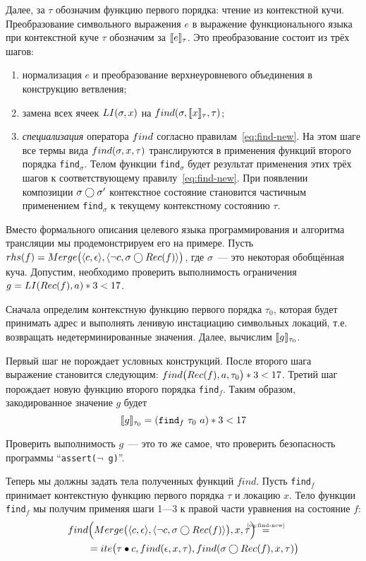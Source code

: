 Далее, за $\tau$ обозначим функцию первого порядка: чтение из контекстной кучи. Преобразование символьного выражения $e$ в выражение функционального языка при контекстной куче $\tau$ обозначим за $\llbracket e\rrbracket_{\tau}$. Это преобразование состоит из трёх шагов:
\begin{enumerate}
\item нормализация $e$ и преобразование верхнеуровневого объединения в конструкцию ветвления;
\item замена всех ячеек $LI(\sigma, x)$ на $find(\sigma,\llbracket x\rrbracket_{\tau},\tau)$;
\item \emph{специализация} оператора $find$ согласно правилам~\eqref{eq:find-new}. На этом шаге все термы вида $find(\sigma,x,\tau)$ транслируются в применения функций второго порядка \texttt{find}$_\sigma$. Телом функции \texttt{find}$_\sigma$ будет результат применения этих трёх шагов к соответствующему правилу~\eqref{eq:find-new}. При появлении композиции $\sigma\bigcirc\sigma'$ контекстное состояние становится частичным применением \texttt{find}$_{\sigma}$ к текущему контекстному состоянию $\tau$.
\end{enumerate}

Вместо формального описания целевого языка программирования и алгоритма трансляции мы продемонстрируем его на примере. Пусть $rhs(f)=Merge\big(\langle c, \epsilon\rangle,\langle\neg c, \sigma\bigcirc Rec(f)\rangle\big)$, где $\sigma$~--- это некоторая обобщённая куча. Допустим, необходимо проверить выполнимость ограничения $g = LI(Rec(f), a) * 3 < 17$.

Сначала определим контекстную функцию первого порядка $\tau_0$, которая будет принимать адрес и выполнять ленивую инстациацию символьных локаций, т.е. возвращать недетерминированные значения. Далее, вычислим $\llbracket g\rrbracket_{\tau_0}$.

Первый шаг не порождает условных конструкций. После второго шага выражение становится следующим: $find\big(Rec(f),a,\tau_0\big) * 3 < 17$. Третий шаг порождает новую функцию второго порядка \texttt{find}$_f$. Таким образом, закодированное значение $g$ будет
\[
	\llbracket g\rrbracket_{\tau_0} = (\texttt{find}_f\,\,\tau_0\,\,a) * 3 < 17
\]

Проверить выполнимость $g$~--- это то же самое, что проверить безопасность программы \mbox{``\texttt{assert($\neg$ g)}''}.

Теперь мы должны задать тела полученных функций $find$. Пусть \texttt{find}$_f$ принимает контекстную функцию первого порядка $\tau$ и локацию $x$. Тело функции \texttt{find}$_f$ мы получим применяя шаги 1---3 к правой части уравнения на состояние $f$:
\begin{align*}
&\Findnew{\GMerge{\pair{c}{\emptyheap},\pair{\neg c}{\gcompose{\sigma}{\grec{f}}}}}{x}{\tau}~\eqbyref{eq:find-new}\\
&\qquad=\Ite{\fillterm{\tau}{c}}{\findnew{\emptyheap}{x}{\tau}}{\findnew{\GCompose{\sigma}{\grec{f}}}{x}{\tau}}
\end{align*}

